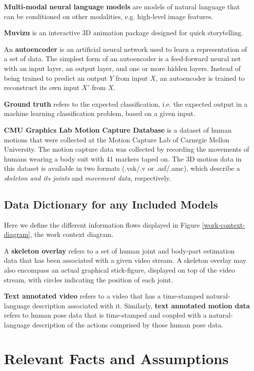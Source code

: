 \documentclass{scrreprt}
\begin{document}
\textbf{Multi-modal neural language models} are models of natural language that
can be conditioned on other modalities, e.g. high-level image
features\cite{DBLP:journals/corr/KirosSZ14}.

\textbf{Muvizu} is an interactive 3D animation package designed for quick storytelling.

An \textbf{autoencoder} is an artificial neural network used to learn a
representation of a set of data. The simplest form of an autoencoder is a
feed-forward neural net with an input layer, an output layer, and one or more
hidden layers. Instead of being trained to predict an output $Y$ from input
$X$, an autoencoder is trained to reconstruct its own input $X'$ from $X$.

\textbf{Ground truth} refers to the expected classification, i.e. the expected
output in a machine learning classification problem, based on a given input.

\textbf{CMU Graphics Lab Motion Capture Database} is a dataset of human motions
that were collected at the Motion Capture Lab of Carnegie Mellon University.
The motion capture data was collected by recording the movements of humans
wearing a body suit with 41 markers taped on. The 3D motion data in this
dataset is available in two formats (.vsk/.v or .asf/.amc), which describe a
\textit{skeleton and its joints} and \textit{movement data}, respectively.

\subsection{Data Dictionary for any Included Models}

Here we define the different information flows displayed in Figure
\ref{work-context-diagram}, the work context diagram.

A \textbf{skeleton overlay} refers to a set of human joint and body-part
estimation data that has been associated with a given video stream. A skeleton
overlay may also encompass an actual graphical stick-figure, displayed on top
of the video stream, with circles indicating the position of each joint.

\textbf{Text annotated video} refers to a video that has a time-stamped
natural-language description associated with it. Similarly, \textbf{text
annotated motion data} refers to human pose data that is time-stamped and
coupled with a natural-language description of the actions comprised by those
human pose data.

\section{Relevant Facts and Assumptions}
\end{document}
